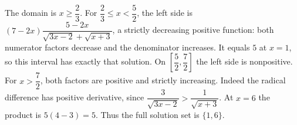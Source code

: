 The domain is $x\ge\dfrac{2}{3}$. For $\dfrac{2}{3}\le x<\dfrac{5}{2}$, the left side is $(7-2x)\dfrac{5-2x}{\sqrt{3x-2}+\sqrt{x+3}}$, a strictly decreasing positive function: both numerator factors decrease and the denominator increases. It equals $5$ at $x=1$, so this interval has exactly that solution. On $[\dfrac{5}{2},\dfrac{7}{2}]$ the left side is nonpositive. For $x>\dfrac{7}{2}$, both factors are positive and strictly increasing. Indeed the radical difference has positive derivative, since $\dfrac{3}{\sqrt{3x-2}}>\dfrac{1}{\sqrt{x+3}}$. At $x=6$ the product is $5(4-3)=5$. Thus the full solution set is $\boxed{\{1,6\}}$.
